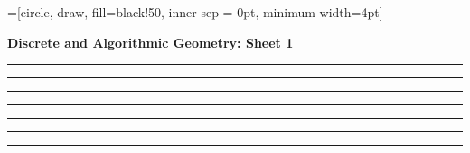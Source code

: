 \documentclass[a4paper, 10pt]{article}
\theoremstyle{definition} %
\begin{document}
\onehalfspacing
{}=[circle, draw, fill=black!50, inner sep = 0pt, minimum width=4pt]

\textbf{\Large Discrete and Algorithmic Geometry: Sheet 1}

\vspace{20pt}



\vspace{5pt}

\begin{center}
    \rule{5cm}{0.4pt}
\end{center}

\newpage



\vspace{5pt}

\begin{center}
    \rule{5cm}{0.4pt}
\end{center}

\newpage



\vspace{5pt}

\begin{center}
    \rule{5cm}{0.4pt}
\end{center}

\newpage



\vspace{5pt}

\begin{center}
    \rule{5cm}{0.4pt}
\end{center}

\newpage



\vspace{5pt}

\begin{center}
    \rule{5cm}{0.4pt}
\end{center}

\newpage



\vspace{5pt}

\begin{center}
    \rule{5cm}{0.4pt}
\end{center}

\newpage



\vspace{5pt}

\begin{center}
    \rule{5cm}{0.4pt}
\end{center}
\end{document}
